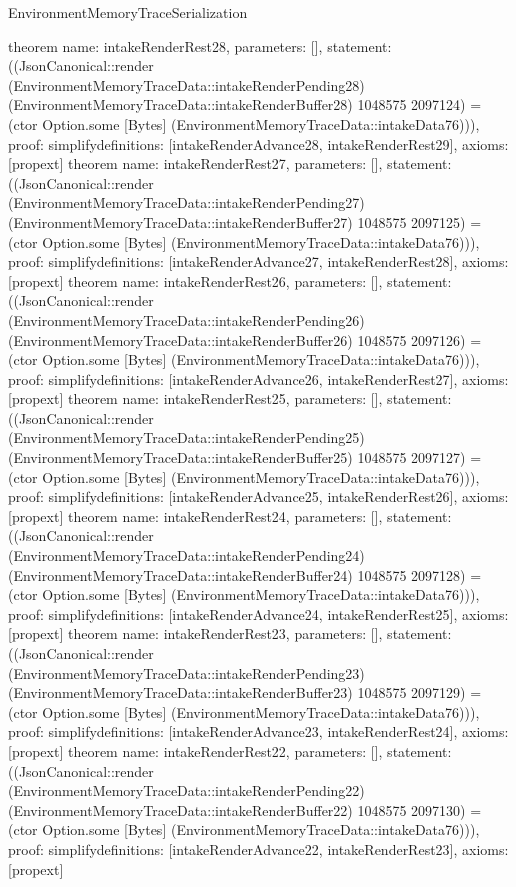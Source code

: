 \begin{lexlean}{EnvironmentMemoryTraceSerialization}
\begin{semanticmodule}
{}
theorem{
 name: intakeRenderRest28, parameters: [],
 statement: ((JsonCanonical::render (EnvironmentMemoryTraceData::intakeRenderPending28) (EnvironmentMemoryTraceData::intakeRenderBuffer28) 1048575 2097124) = (ctor Option.some [Bytes] (EnvironmentMemoryTraceData::intakeData76))), proof: simplify{definitions: [intakeRenderAdvance28, intakeRenderRest29]}, axioms: [propext]
}
theorem{
 name: intakeRenderRest27, parameters: [],
 statement: ((JsonCanonical::render (EnvironmentMemoryTraceData::intakeRenderPending27) (EnvironmentMemoryTraceData::intakeRenderBuffer27) 1048575 2097125) = (ctor Option.some [Bytes] (EnvironmentMemoryTraceData::intakeData76))), proof: simplify{definitions: [intakeRenderAdvance27, intakeRenderRest28]}, axioms: [propext]
}
theorem{
 name: intakeRenderRest26, parameters: [],
 statement: ((JsonCanonical::render (EnvironmentMemoryTraceData::intakeRenderPending26) (EnvironmentMemoryTraceData::intakeRenderBuffer26) 1048575 2097126) = (ctor Option.some [Bytes] (EnvironmentMemoryTraceData::intakeData76))), proof: simplify{definitions: [intakeRenderAdvance26, intakeRenderRest27]}, axioms: [propext]
}
theorem{
 name: intakeRenderRest25, parameters: [],
 statement: ((JsonCanonical::render (EnvironmentMemoryTraceData::intakeRenderPending25) (EnvironmentMemoryTraceData::intakeRenderBuffer25) 1048575 2097127) = (ctor Option.some [Bytes] (EnvironmentMemoryTraceData::intakeData76))), proof: simplify{definitions: [intakeRenderAdvance25, intakeRenderRest26]}, axioms: [propext]
}
theorem{
 name: intakeRenderRest24, parameters: [],
 statement: ((JsonCanonical::render (EnvironmentMemoryTraceData::intakeRenderPending24) (EnvironmentMemoryTraceData::intakeRenderBuffer24) 1048575 2097128) = (ctor Option.some [Bytes] (EnvironmentMemoryTraceData::intakeData76))), proof: simplify{definitions: [intakeRenderAdvance24, intakeRenderRest25]}, axioms: [propext]
}
theorem{
 name: intakeRenderRest23, parameters: [],
 statement: ((JsonCanonical::render (EnvironmentMemoryTraceData::intakeRenderPending23) (EnvironmentMemoryTraceData::intakeRenderBuffer23) 1048575 2097129) = (ctor Option.some [Bytes] (EnvironmentMemoryTraceData::intakeData76))), proof: simplify{definitions: [intakeRenderAdvance23, intakeRenderRest24]}, axioms: [propext]
}
theorem{
 name: intakeRenderRest22, parameters: [],
 statement: ((JsonCanonical::render (EnvironmentMemoryTraceData::intakeRenderPending22) (EnvironmentMemoryTraceData::intakeRenderBuffer22) 1048575 2097130) = (ctor Option.some [Bytes] (EnvironmentMemoryTraceData::intakeData76))), proof: simplify{definitions: [intakeRenderAdvance22, intakeRenderRest23]}, axioms: [propext]
}
\end{semanticmodule}
\end{lexlean}
